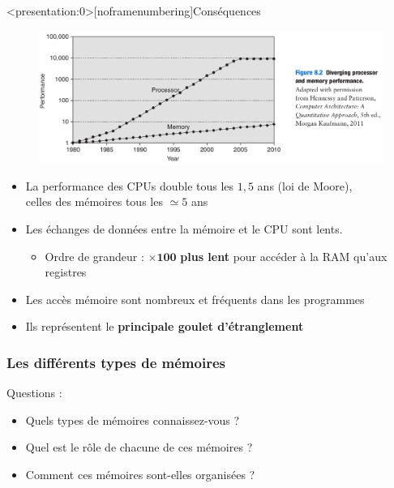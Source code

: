 \documentclass[8pt]{beamer}
\begin{document}
\begin{frame}<presentation:0>[noframenumbering]{Cons\'equences}
    \begin{figure}[ht]
        \centering
        \centering
        \includegraphics[width=.75\linewidth]{figures/gap_cpu_ram_H.png}
        \label{fig:sub2}
    \end{figure}
    \begin{itemize}
        \item La performance des CPUs double tous les $1,5$ ans (loi de Moore),
              \\ celles des mémoires tous les $\simeq5$ ans
        \item Les \'echanges de données entre la mémoire et le CPU sont
              lents.
              \begin{itemize}
                  \item Ordre de grandeur : $\boldsymbol{\times}\textbf{100}$
                        \textbf{plus
                            lent}
                        pour
                        accéder
                        à la RAM qu'aux registres
              \end{itemize}
        \item Les acc\`es mémoire sont nombreux et fréquents dans les
              programmes
        \item Ils repr\'esentent le \textbf{principale goulet d'\'etranglement}
    \end{itemize}
\end{frame}

\begin{frame}
    \frametitle{Les différents types de mémoires}
    \begin{alertblock}{Questions :}
        \begin{itemize}
            \item Quels types de m\'emoires connaissez-vous ?
            \item Quel est le r\^ole de chacune de ces m\'emoires ?
            \item Comment ces m\'emoires sont-elles organis\'ees ?
        \end{itemize}
    \end{alertblock}
\end{frame}
\end{document}
